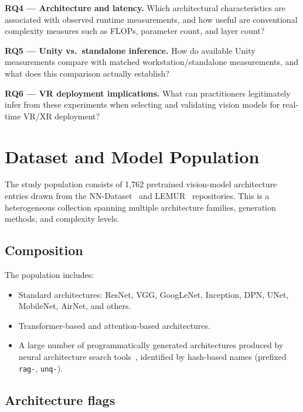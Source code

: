 \documentclass[10pt,twocolumn,letterpaper]{article}
\begin{document}
\noindent\textbf{RQ4 --- Architecture and latency.}
Which architectural characteristics are associated with observed runtime measurements, and how useful are conventional complexity measures such as FLOPs, parameter count, and layer count?

\noindent\textbf{RQ5 --- Unity vs.\ standalone inference.}
How do available Unity measurements compare with matched workstation/standalone measurements, and what does this comparison actually establish?

\noindent\textbf{RQ6 --- VR deployment implications.}
What can practitioners legitimately infer from these experiments when selecting and validating vision models for real-time VR/XR deployment?

\section{Dataset and Model Population}\label{sec:population}

The study population consists of 1,762 pretrained vision-model architecture entries drawn from the NN-Dataset~\cite{ABrain.NN-Dataset} and LEMUR~\cite{ABrain.LEMUR2} repositories. This is a heterogeneous collection spanning multiple architecture families, generation methods, and complexity levels.

\subsection{Composition}

The population includes:
\begin{itemize}[nosep,leftmargin=*]
  \item Standard architectures: ResNet, VGG, GoogLeNet, Inception, DPN, UNet, MobileNet, AirNet, and others.
  \item Transformer-based and attention-based architectures.
  \item A large number of programmatically generated architectures produced by neural architecture search tools~\cite{ABrain.NNGPT, ABrain.NN-RAG}, identified by hash-based names (prefixed \texttt{rag-}, \texttt{unq-}).
\end{itemize}

\subsection{Architecture flags}
\end{document}

